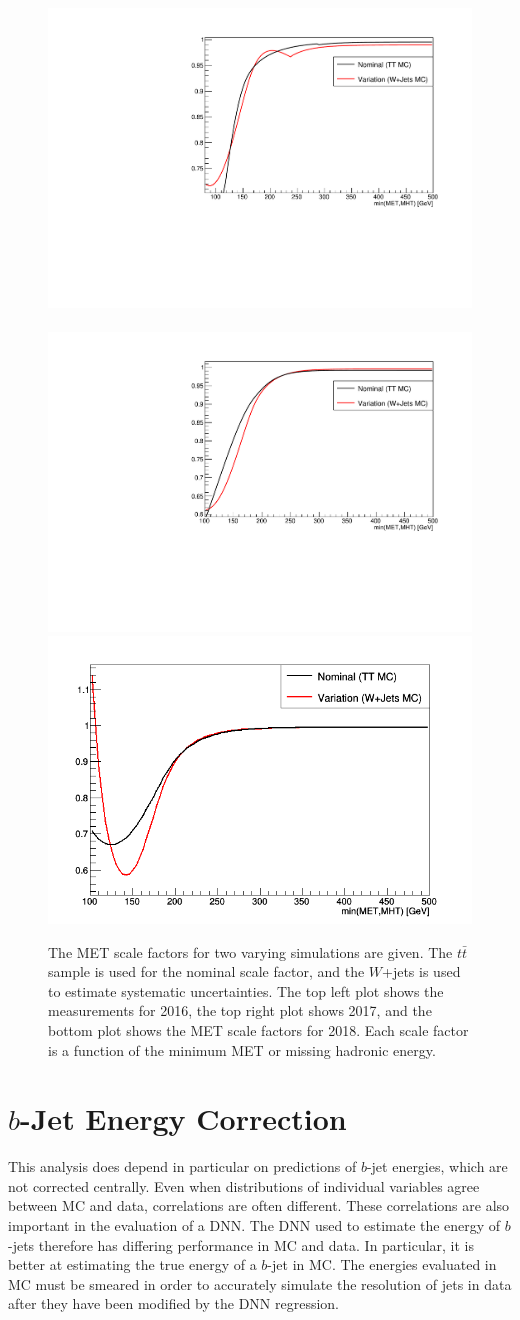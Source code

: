 \begin{figure}
  \centering
  \includegraphics[width=0.5\linewidth]{figures/METSF2016.pdf}~
  \includegraphics[width=0.5\linewidth]{figures/METSF2017.pdf}
  \includegraphics[width=0.5\linewidth]{figures/METSF2018.png}
  \caption[MET trigger scale factors]{
    The MET scale factors for two varying simulations are given.
    The $t\bar{t}$ sample is used for the nominal scale factor,
    and the $W$+jets is used to estimate systematic uncertainties.
    The top left plot shows the measurements for 2016,
    the top right plot shows 2017,
    and the bottom plot shows the MET scale factors for 2018.
    Each scale factor is a function of the minimum MET or missing hadronic energy.
  }
  \label{fig:met-sf}
\end{figure}

\section{$b$-Jet Energy Correction}

This analysis does depend in particular on predictions of $b$-jet energies,
which are not corrected centrally.
Even when distributions of individual variables agree between MC and data,
correlations are often different.
These correlations are also important in the evaluation of a DNN.
The DNN used to estimate the energy of $b$-jets therefore has differing performance
in MC and data.
In particular, it is better at estimating the true energy of a $b$-jet in MC.
The energies evaluated in MC must be smeared in order to accurately simulate
the resolution of jets in data after they have been modified by the DNN regression.

